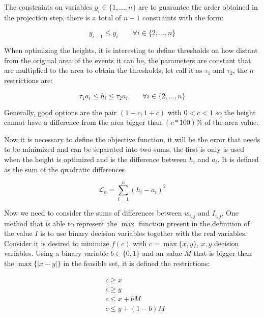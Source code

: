 %
The constraints on variables $y_i \in \{1, \dots, n \}$ are to guarantee the order obtained in the projection step, there is a total of $n-1$ constraints with the form:

\begin{equation}
    y_{i - 1} \leq y_i \quad \quad \forall i \in \{2, \dots, n\}
\end{equation}
\label{eq:order-constraint}

%
When optimizing the heights, it is interesting to define thresholds on how distant from the original area of the events it can be, the parameters are constant that are multiplied to the area to obtain the thresholds, let call it as $\tau_1$ and $\tau_2$, the $n$ restrictions are:

\begin{equation}
    \tau_1 a_i \leq h_i \leq \tau_2 a_i \quad \quad \forall i \in \{2, \dots, n\}
\end{equation}
\label{eq:height-constraint}

Generally, good options are the pair $(1 - c,  1 + c)$ with $0 < c < 1$ so the height cannot have a difference from the area bigger than $(c*100)\%$ of the area value.
%

Now it is necessary to define the objective function, 
%
it will be the error that needs to be minimized and can be separated into two sums, the first is only is used when the height is optimized and is the difference between $h_i$ and $a_i$. It is defined as the sum of the quadratic differences
%

\begin{equation}
    \mathcal{L}_h = \sum_{i = 1}^n (h_i - a_i)^2
\end{equation}

Now we need to consider the sums of differences between $w_{i, j}$ and $I_{i, j}$.
%
One method that is able to represent the $\max$ function present in the definition of the value $I$ is to use binary decision variables together with the real variables. Consider it is desired to minimize $f(c)$ with $c = \max \{x, y\}$, $x, y$ decision variables. Using a binary variable $b \in \{0, 1\}$ and an value $M$ that is bigger than the $\max \{ | x -y |\}$ in the feasible set, it is defined the restrictions:

\begin{equation}
    \begin{split}
        &c \geq x \\
        &c \geq y \\
        &c \leq x + bM \\
        &c \leq y + (1- b)M 
    \end{split}
    \label{binary_max_trick}
\end{equation}

